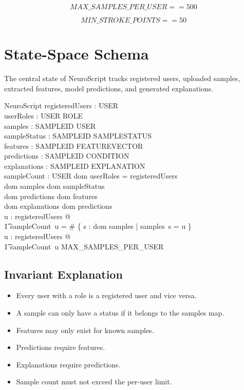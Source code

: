 \documentclass[12pt,a4paper]{article}
\begin{document}
\[
MAX\_SAMPLES\_PER\_USER == 500
\]

\[
MIN\_STROKE\_POINTS == 50
\]

\section{State-Space Schema}

The central state of NeuroScript tracks registered users, uploaded samples, extracted features, model predictions, and generated explanations.

\begin{schema}{NeuroScript}
registeredUsers : \power USER \\
userRoles : USER \pfun ROLE \\
samples : SAMPLEID \pfun USER \\
sampleStatus : SAMPLEID \pfun SAMPLESTATUS \\
features : SAMPLEID \pfun FEATUREVECTOR \\
predictions : SAMPLEID \pfun CONDITION \\
explanations : SAMPLEID \pfun EXPLANATION \\
sampleCount : USER \fun \nat
\where
dom userRoles = registeredUsers \\
dom samples \subseteq dom sampleStatus \\
dom predictions \subseteq dom features \\
dom explanations \subseteq dom predictions \\
\forall u : registeredUsers @ \\
\t1 sampleCount~u = \# \{ s : dom samples | samples~s = u \} \\
\forall u : registeredUsers @ \\
\t1 sampleCount~u \leq MAX\_SAMPLES\_PER\_USER
\end{schema}

\subsection*{Invariant Explanation}

\begin{itemize}
    \item Every user with a role is a registered user and vice versa.
    \item A sample can only have a status if it belongs to the samples map.
    \item Features may only exist for known samples.
    \item Predictions require features.
    \item Explanations require predictions.
    \item Sample count must not exceed the per-user limit.
\end{itemize}
\end{document}
